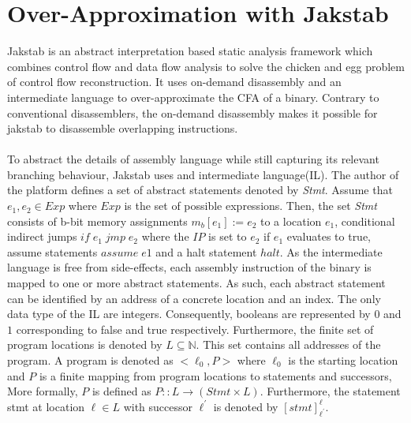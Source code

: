 \documentclass{kththesis}
\newcommand{\fbcomment}[1]{{#1}}
\renewcommand{\fbcomment}[1]{}
\renewcommand{\it}[1]{\textit{#1}}
\begin{document}
\section{Over-Approximation with Jakstab}
\fbcomment{\color{red}Goal: give the reader an overview of jakstab and enough understanding of the notation in the phd thesis of Jakstab(So that this can be used in later sections such for example as the section about CPA modifications). Also, introduce concepts such as tops and bottoms in the context of the Jakstab tool}
Jakstab\cite{Jakstab} is an abstract interpretation based static analysis framework which combines control flow and data flow analysis to solve the chicken and egg problem of control flow reconstruction. It uses on-demand disassembly and an intermediate language to over-approximate the CFA of a binary. Contrary to conventional disassemblers, the on-demand disassembly makes it possible for jakstab to disassemble overlapping instructions. 
\\ \\
To abstract the details of assembly language while still capturing its relevant branching behaviour, Jakstab uses and intermediate language(IL). The author of the platform defines a set of abstract statements denoted by \it{Stmt}. Assume that $e_1,e_2 \in Exp$ where $Exp$ is the set of possible expressions. Then, the set \it{Stmt} consists of b-bit memory assignments $m_b[e_1] := e_2$ to a location $e_1$, conditional indirect jumps $if\;e_1\;jmp\;e_2$ where the $IP$ is set to $e_2$ if $e_1$ evaluates to true, assume statements $assume\;e1$ and a halt statement $halt$. As the intermediate language is free from side-effects, each assembly instruction of the binary is mapped to one or more abstract statements. As such, each abstract statement can be identified by an address of a concrete location and an index. 
\clearpage
\noindent
The only data type of the IL are integers. Consequently, booleans are represented by $0$ and $1$ corresponding to false and true respectively. Furthermore, the finite set of program locations is denoted by $L \subseteq \mathbb{N}$. This set contains all addresses of the program. A program is denoted as $<\ell_0,P>$ where $\ell_0$ is the starting location and $P$ is a finite mapping from program locations to statements and successors, More formally, $P$ is defined as $P:: L \rightarrow (Stmt \times L)$. Furthermore, the statement stmt at location $\ell \in L$ with successor $\ell^{'}$ is denoted by $[stmt]^{\ell}_{\ell^{'}}$. 
\\ \\
\end{document}
